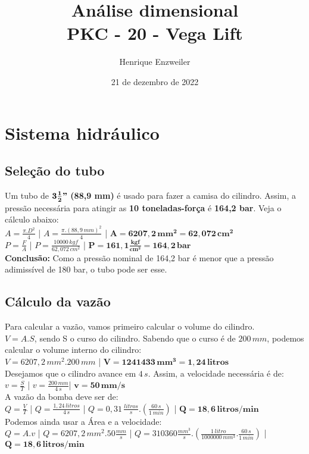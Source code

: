 \documentclass[12pt,a4paper,final]{report}
\title{An\'alise dimensional \\[1ex] \large PKC - 20 - Vega Lift}
\author{Henrique Enzweiler}
\date{21 de dezembro de 2022}
\begin{document}
\maketitle

\chapter{Sistema hidr\'aulico}

\section{Sele\c{c}\~ao do tubo}

Um tubo de $\boldsymbol{3\frac{1}{2}"}$ \textbf{(88,9 mm)} \'e usado
para fazer a camisa do cilindro. Assim, a press\~ao necess\'aria para
atingir as \textbf{10 toneladas-for\c{c}a }\'e\textbf{ 164,2 bar}.
Veja o c\'alculo abaixo:\\

$A=\frac{\pi.D^{2}}{4}$ | $A=\frac{\pi.(88,9\,mm)^{2}}{4}$ | $\boldsymbol{A=6207,2\,mm^{2}=62,072\,cm^{2}}$\\

$P=\frac{F}{A}$ | $P=\frac{10000\,kgf}{62,072\,cm^{2}}$ | $\boldsymbol{P=161,1\frac{kgf}{cm^{2}}=164,2\,bar}$\\

\textbf{Conclus\~ao:} Como a pressão nominal de 164,2 bar \'e menor que a press\~ao adimiss\'ivel de 180 bar, o tubo pode ser esse.

\section{C\'alculo da vaz\~ao}

Para calcular a vaz\~ao, vamos primeiro calcular o volume do cilindro.\\

$V=A.S$, sendo S o curso do cilindro. Sabendo que o curso \'e de
$200\,mm$, podemos calcular o volume interno do cilindro:\\

$V=6207,2\,mm^{2}.200\,mm$ | $\boldsymbol{V=1241433\,mm^{3}=1,24\,litros}$\\

Desejamos que o cilindro avance em $4\,s.$ Assim, a velocidade necess\'aria \'e de:\\

$v=\frac{S}{T}$ | $v=\frac{200\,mm}{4\,s}$| $\boldsymbol{v=50\,mm/s}$\\

A vaz\~ao da bomba deve ser de:\\

$Q=\frac{V}{T}$ | $Q=\frac{1,24\,litros}{4\,s}$ | $Q=0,31\,\frac{litros}{s}.(\frac{60\,s}{1\,min})$
| $\boldsymbol{Q=18,6\,litros/min}$\\

Podemos ainda usar a \'Area e a velocidade:\\

$Q=A.v$ | $Q=6207,2\,mm^{2}.50\frac{mm}{s}$ | $Q=310360\frac{mm^{3}}{s}.(\frac{1\,litro}{1000000\,mm^{3}}.\frac{60\,s}{1\,min})$
| $\boldsymbol{Q=18,6\,litros/min}$
\end{document}
